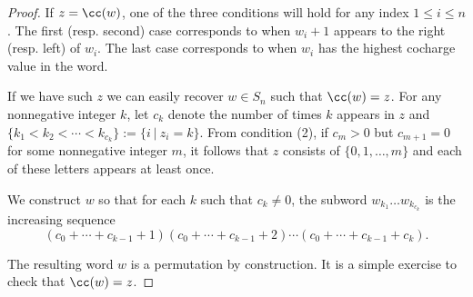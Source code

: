 \begin{proof}
    If $z = \cc(w)$, one of the three conditions will hold for any index $1\leq i \leq n$.
    The first (resp. second) case corresponds to when $w_i + 1$ appears to the right (resp. left) of $w_i$. 
   The last case corresponds to when $w_i$ has the highest cocharge value in the word.
   
   If we have such $z$ we can easily recover $w\in S_n$ such that $\cc(w) = z$. 
    For any nonnegative integer $k$, let $c_k$ denote the number of times $k$ appears in $z$ and $\{k_1<k_2<\cdots<k_{c_k}\} := \{i \ | \ z_i = k\}$. From condition (2), if $c_m >0$ but $c_{m+1} = 0$ for some nonnegative integer $m$, it follows that $z$ consists of $\{0,1,\dots, m\}$ and each of these letters appears at least once.

    We construct $w$ so that for each $k$ such that $c_k\neq 0$, the subword $w_{k_1}\dots w_{k_{c_k}}$ is the increasing sequence \[(c_0+\cdots+ c_{k-1} + 1)(c_0+\cdots+ c_{k-1} + 2)\cdots (c_0+\cdots+ c_{k-1} + c_k).\] 
    
    The resulting word $w$ is a permutation by construction. It is a simple exercise to check that $\cc(w) = z$.
    \end{proof}

